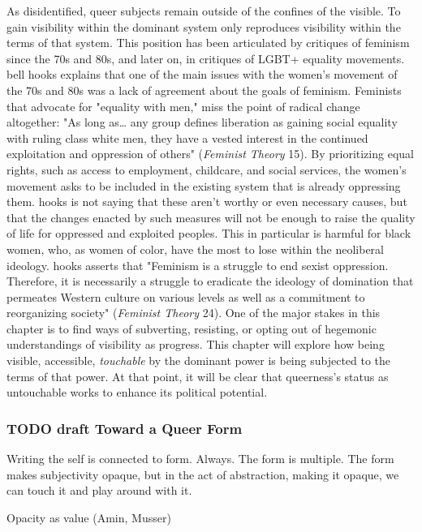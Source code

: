 \documentclass[11pt]{article}
\begin{document}
As disidentified, queer subjects remain outside of the confines of the
visible. To gain visibility within the dominant system only reproduces
visibility within the terms of that system. This position has been
articulated by critiques of feminism since the 70s and 80s, and later
on, in critiques of LGBT+ equality movements. bell hooks explains that
one of the main issues with the women's movement of the 70s and 80s
was a lack of agreement about the goals of feminism. Feminists that
advocate for "equality with men," miss the point of radical change
altogether: "As long as\ldots{} any group defines liberation as gaining
social equality with ruling class white men, they have a vested
interest in the continued exploitation and oppression of others"
(\emph{Feminist Theory} 15). By prioritizing equal rights, such as access
to employment, childcare, and social services, the women's movement
asks to be included in the existing system that is already oppressing
them. hooks is not saying that these aren't worthy or even necessary
causes, but that the changes enacted by such measures will not be
enough to raise the quality of life for oppressed and exploited
peoples. This in particular is harmful for black women, who, as women
of color, have the most to lose within the neoliberal ideology. hooks
asserts that "Feminism is a struggle to end sexist
oppression. Therefore, it is necessarily a struggle to eradicate the
ideology of domination that permeates Western culture on various
levels as well as a commitment to reorganizing society" (\emph{Feminist
Theory} 24). One of the major stakes in this chapter is to find ways
of subverting, resisting, or opting out of hegemonic understandings of
visibility as progress. This chapter will explore how being visible,
accessible, \emph{touchable} by the dominant power is being subjected to
the terms of that power. At that point, it will be clear that
queerness's status as untouchable works to enhance its political
potential.

\subsubsection{{\bfseries\sffamily TODO} draft Toward a Queer Form}
\label{sec:orge26772b}
Writing the self is connected to form. Always. The form is
multiple. The form makes subjectivity opaque, but in the act of
abstraction, making it opaque, we can touch it and play around with
it. 

Opacity as value (Amin, Musser)
\end{document}
